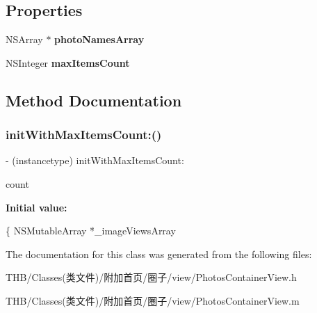 \subsection*{Properties}
\begin{DoxyCompactItemize}
\item 
\mbox{\label{interface_photos_container_view_affcdee1d5e02aea974643a899f5311b3}} 
N\+S\+Array $\ast$ {\bfseries photo\+Names\+Array}
\item 
\mbox{\label{interface_photos_container_view_ab2b3c1bf94af583e9dfd01c683d00bb0}} 
N\+S\+Integer {\bfseries max\+Items\+Count}
\end{DoxyCompactItemize}


\subsection{Method Documentation}
\mbox{\label{interface_photos_container_view_a304f44b1c0aa775978a7310c6fcdec3b}} 
\subsubsection{\texorpdfstring{init\+With\+Max\+Items\+Count\+:()}{initWithMaxItemsCount:()}}
{\footnotesize\ttfamily -\/ (instancetype) init\+With\+Max\+Items\+Count\+: \begin{DoxyParamCaption}\item[{(N\+S\+Integer)}]{count }\end{DoxyParamCaption}}

{\bfseries Initial value\+:}
\begin{DoxyCode}
\{
    NSMutableArray *\_imageViewsArray
\end{DoxyCode}


The documentation for this class was generated from the following files\+:\begin{DoxyCompactItemize}
\item 
T\+H\+B/\+Classes(类文件)/附加首页/圈子/view/Photos\+Container\+View.\+h\item 
T\+H\+B/\+Classes(类文件)/附加首页/圈子/view/Photos\+Container\+View.\+m\end{DoxyCompactItemize}
